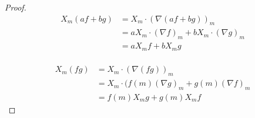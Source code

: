 \documentclass{article}
\theoremstyle{problemstyle}
\theoremstyle{problemstyle}
\theoremstyle{problemstyle}
\theoremstyle{problemstyle}
\theoremstyle{problemstyle}
\begin{document}
\begin{proof}
\begin{align*}
X_m(af+bg) &= X_m \cdot (\nabla (af+bg))_m\\
 &=aX_m \cdot (\nabla f)_m+bX_m \cdot (\nabla g)_m \\
 &= aX_mf+bX_mg
\end{align*}\\

\begin{align*}
X_m(fg) &= X_m \cdot (\nabla (fg))_m\\
 &= X_m \cdot (f(m)(\nabla g)_m+g(m)(\nabla f)_m \\
 &= f(m)X_mg+g(m)X_mf
\end{align*}
\end{proof}



\newpage
\end{document}
